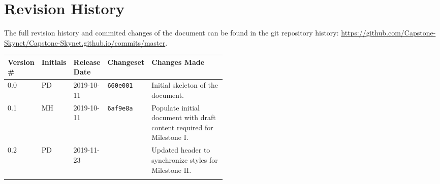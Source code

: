 \thispagestyle{empty}
\section*{Revision History}
The full revision history and commited changes of the document can be found in the git repository history: \href{https://github.com/Capstone-Skynet/Capstone-Skynet.github.io}{https://github.com/Capstone-Skynet/Capstone-Skynet.github.io/commits/master}.

\begin{table}[H]
\begin{tabular}{*{4}{l}p{0.5\linewidth}}
\hline
Version \# & Initials & Release Date & Changeset & Changes Made \\ \hline

0.0 & PD & 2019-10-11 & \texttt{660e001} & Initial skeleton of the document.\\
0.1 & MH & 2019-10-11 & \texttt{6af9e8a} & Populate initial document with draft content required for Milestone I.\\
0.2 & PD & 2019-11-23 & \texttt{} & Updated header to synchronize styles for Milestone II.\\

 & & & \\ \hline
\end{tabular}
\end{table}